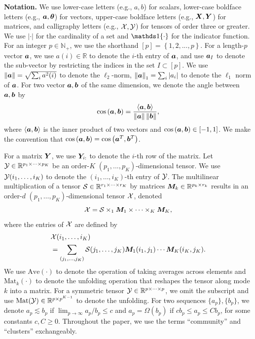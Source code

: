 \documentclass[lettersize,onecolumn,journal]{IEEEtran}
\theoremstyle{definition}
\theoremstyle{definition}
\newcommand{\of}[1]{\left(#1\right)}
\newcommand{\offf}[1]{\left\{#1\right\}}
\newcommand{\ang}[1]{\left\langle#1\right\rangle}
\def\fixme#1#2{\textbf{\color{red}[FIXME (#1): #2]}}
\begin{document}
{\bf Notation.} We use lower-case letters (e.g., $a,b$) for scalars, lower-case boldface letters (e.g., $\bm{a},\boldsymbol{\theta}$) for vectors, upper-case boldface letters (e.g., $\bm X,\bm Y$) for matrices, and calligraphy letters (e.g., $\mathcal{X},\mathcal{Y}$) for tensors of order three or greater. We use $|\cdot|$ for the cardinality of a set and $\ind\{\cdot\}$ for the indicator function. For an integer $p\in\mathbb{N}_{+}$, we use the shorthand $[p]= \offf{1,2,...,p}$. For a length-$p$ vector $\bm{a}$, we use $a(i)\in\mathbb{R}$ to denote the $i$-th entry of $\bm{a}$, and use $\bm{a}_{I}$ to denote the sub-vector by restricting the indices in the set $I\subset [p]$.  We use  $\left\lVert\bm{a}\right\rVert=\sqrt{\sum_{i}a^2(i)}$ to denote the $\ell_2$-norm, $\left\lVert\bm{a}\right\rVert_1=\sum_i |a_i|$ to denote the $\ell_1$ norm of $\bm{a}$. For two vector $\bm{a}, \bm{b}$ of the same dimension, we denote the angle between $\bm{a}, \bm{b}$ by 
\begin{equation}
    \cos \of{\ma, \mb} = \frac{\ang{ \ma, \mb}}{ \onorm{\ma} \onorm{\mb} },
\end{equation}
where $\ang{\ma,\mb}$ is the inner product of two vectors and $\cos \of{\ma, \mb} \in [-1,1]$. We make the convention that $\cos \of{\ma, \mb} = \cos \of{\ma^T, \mb^T}$.

For a matrix $\bm Y$, we use $\bm Y_{i:}$ to  denote the $i$-th row of the matrix. Let $\mathcal{Y}  \in \mathbb{R}^{p_1 \times \cdots \times p_K}$ be an order-$K$ $(p_1,...,p_K)$-dimensional tensor. We use $\mathcal{Y}(i_1,\ldots,i_K)$ to denote the $(i_1,\ldots,i_K)$-th entry of $\mathcal{Y}$. The multilinear multiplication of a tensor $\mathcal{S}\in \mathbb{R}^{r_1\times \cdots \times r_K}$ by matrices $\bm M_k \in\mathbb{R}^{p_k\times r_k}$ results in an order-$d$ $(p_1,\ldots,p_K)$-dimensional tensor $\mathcal{X}$, denoted
\[
\mathcal{X}=\mathcal{S} \times_1 \bm M_1 \times \cdots \times_K \bm M_K,
\]
where the entries of $\mathcal{X}$ are defined by
\begin{align}
    &\mathcal{X}(i_1,\ldots, i_K)\\
    &=\sum_{(j_1,\ldots,j_K)}\mathcal{S}(j_1,\ldots,j_K)\bm M_1(i_1,j_1)\cdots \bm M_K(i_K,j_K).
\end{align} 
 We use $\text{Ave}(\cdot)$ to denote the operation of taking averages across elements and $\text{Mat}_k(\cdot)$ to denote the unfolding operation that reshapes the tensor along mode $k$ into a matrix. For a symmetric tensor $\mathcal{Y}\in\mathbb{R}^{p\times \cdots \times p}$, we omit the subscript and use $\text{Mat}(\mathcal{Y})\in\mathbb{R}^{p\times p^{K-1}}$ to denote the unfolding. For two sequences $\{a_p\}, \{b_p\}$, we denote $a_p\lesssim b_p$ if $\lim_{p\to\infty} a_p/b_p \leq c$ and $a_p = \Omega(b_p)$ if $c b_p \leq a_p \leq C b_p$, for some constants $c, C\geq 0$. Throughout the paper, we use the terms ``community'' and ``clusters'' exchangeably. 
\end{document}
